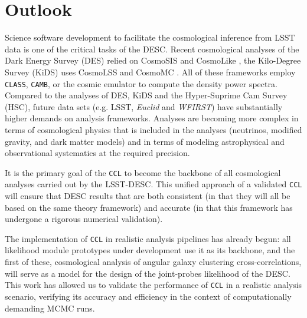 \documentclass[\docopts]{\docclass}
\newcommand{\damonge}[1]{\textcolor{green!55!blue}{DA: #1}}
\newcommand{\ccl}{{\tt CCL}\xspace}
\newcommand{\class}{{\tt CLASS}\xspace}
\newcommand{\camb}{{\tt CAMB}\xspace}
\begin{document}
\section{Outlook}
\label{sec:conclusion}

Science software development to facilitate the cosmological inference from LSST data is one of the critical tasks of the DESC. Recent cosmological analyses of the Dark Energy Survey (DES) relied on CosmoSIS \citep{Zuntz14} and CosmoLike \citep{krause17}, the Kilo-Degree Survey (KiDS) uses CosmoLSS \citep{Joudaki18} and CosmoMC \citep{Lewis02}. All of these frameworks employ \class, \camb \citep{Challinor2005}, or the cosmic emulator to compute the density power spectra. Compared to the analyses of DES, KiDS and the Hyper-Suprime Cam Survey (HSC), future data sets (e.g. LSST, {\it Euclid} and {\it WFIRST}) have substantially higher demands on analysis frameworks. Analyses are becoming more complex in terms of cosmological physics that is included in the analyses (neutrinos, modified gravity, and dark matter models) and in terms of modeling astrophysical and observational systematics at the required precision. 

It is the primary goal of the \ccl to become the backbone of all cosmological analyses carried out by the LSST-DESC. This unified approach of a validated \ccl will ensure that DESC results that are both consistent (in that they will all be based on the same theory framework) and accurate (in that this framework has undergone a rigorous numerical validation).

The implementation of \ccl in realistic analysis pipelines has already begun: all likelihood module prototypes under development use it as its backbone, and the first of these, cosmological analysis of angular galaxy clustering cross-correlations, will serve as a model for the design of the joint-probes likelihood of the DESC. This work has allowed us to validate the performance of \ccl in a realistic analysis scenario, verifying its accuracy and efficiency in the context of computationally demanding MCMC runs. %
\end{document}
